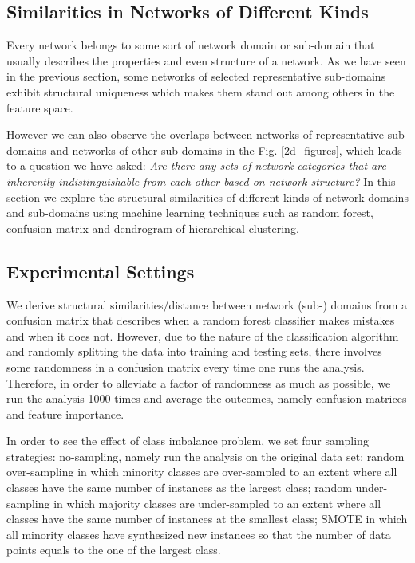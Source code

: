 \documentclass{article}
\begin{document}
\subsection{Similarities in Networks of Different Kinds}
Every network belongs to some sort of network domain or sub-domain that usually describes the properties and even structure of a network. As we have seen in the previous section, some networks of selected representative sub-domains exhibit structural uniqueness which makes them stand out among others in the feature space.

However we can also observe the overlaps between networks of representative sub-domains and networks of other sub-domains in the Fig. \ref{2d_figures}, which leads to a question we have asked:  \textit{Are there any sets of network categories that are inherently indistinguishable from each other based on network structure?} In this section we explore the structural similarities of different kinds of network domains and sub-domains using machine learning techniques such as random forest, confusion matrix and dendrogram of hierarchical clustering.  

\subsection{Experimental Settings}
We derive structural similarities/distance between network (sub-) domains from a confusion matrix that describes when a random forest classifier makes mistakes and when it does not. However, due to the nature of the classification algorithm and randomly splitting the data into training and testing sets, there involves some randomness in a confusion matrix every time one runs the analysis. Therefore, in order to alleviate a factor of randomness as much as possible, we run the analysis 1000 times and average the outcomes, namely confusion matrices and feature importance. 

In order to see the effect of class imbalance problem, we set four sampling strategies: no-sampling, namely run the analysis on the original data set; random over-sampling in which minority classes are over-sampled to an extent where all classes have the same number of instances as the largest class; random under-sampling in which majority classes are under-sampled to an extent where all classes have the same number of instances at the smallest class; SMOTE in which all minority classes have synthesized new instances so that the number of data points equals to the one of the largest class.
 
\end{document}
